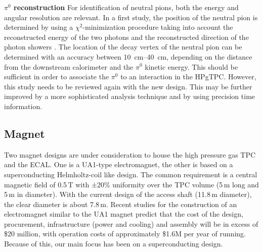 \textbf{$\pi^0$ reconstruction} For identification of neutral pions, both the energy and angular resolution are relevant. In a first study, the position of the neutral pion is determined by using a $\chi^2$-minimization procedure taking into account the reconstructed energy of the two photons and the reconstructed direction of the photon showers \cite{Emberger:2018pgr}. The location of the decay vertex of the neutral pion can be determined with an accuracy between \SIrange{10}{40}{\cm}, depending on the distance from the downstream calorimeter and the $\pi^0$ kinetic energy. This should be sufficient in order to associate the $\pi^0$ to an interaction in the HPgTPC. However, this study needs to be reviewed again with the new design. This may be further improved by a more sophisticated analysis technique and by using precision time information.




\subsection{Magnet}
%
Two magnet designs are under consideration to house the high pressure gas TPC and the ECAL. One is a UA1-type electromagnet, the other is based on a superconducting Helmholtz-coil like design. The common requirement is a central magnetic field of 0.5\,T with ±20\% uniformity over the TPC volume (5\,m long and 5\,m in diameter). With the current design of the access shaft (11.8\,m diameter), the clear diameter is about 7.8\,m. Recent studies for the construction of an electromagnet similar to the UA1 magnet predict that the cost of the design, procurement, infrastructure (power and cooling) and assembly will be in excess of \$20 million, with operation costs of approximately \$1.6M per year of running.  Because of this, our main focus has been on a superconducting design.
%
